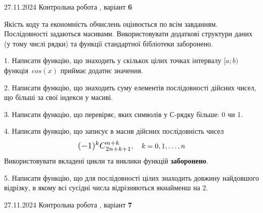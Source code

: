 \documentclass[12pt, ukrainian]{article}
\begin{document}
{{{{{%
{{27.11.2024 Контрольна робота , варіант  \No \textbf { 6 }\par}}


{
Якість коду та економність обчислень оцінюється по всім завданням. Послідовності задаються масивами. Використовувати додаткові структури даних (у тому числі рядки) та функції стандартної бібліотеки заборонено.

\vspace{2mm}

\begin {large}
1. Написати функцію, що знаходить у скількох цілих точках інтервалу $[a; b)$ функція~$cos(x)$ приймає додатнє значення.

\vspace{2mm}


2. Написати функцію, що знаходить суму елементів послідовності дійсних чисел, що більші за свої індекси у масиві.

\vspace{2mm}


3. Написати функцію, що перевіряє, яких символів у С-рядку більше: 0 чи 1.

\vspace{2mm}


4. 
Написати функцію, що записує в масив дійсних послідовність чисел
$$\scalebox{1.2}{$(-1)^{k}C_{2n+k+1}^{n+k}$}, \quad k=0,1,\ldots,n$$
Використовувати вкладені цикли та виклики функцій \textbf{заборонено}.

\vspace{2mm}


5. Написати функцію, що для послідовності цілих знаходить довжину найдовшого відрізку, в якому всі сусідні числа відрізняються якнайменш на 2.

\vspace{2mm}

\end{large}
\newpage
{{27.11.2024 Контрольна робота , варіант  \No \textbf { 7 }\par}}

}}}}}}
\end{document}
